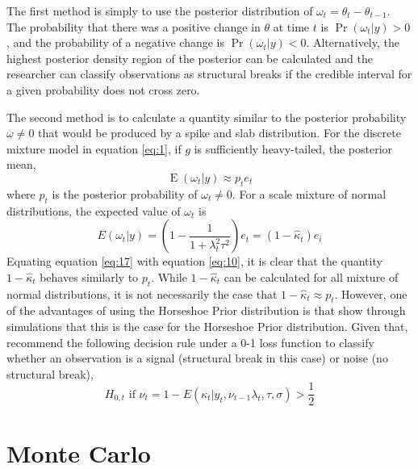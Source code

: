 \documentclass{article}
\DeclareMathOperator{\E}{E}
\begin{document}
The first method is simply to use the posterior distribution of $\omega_{t} = \theta_{t} - \theta_{t-1}$.
The probability that there was a positive change in $\theta$ at time $t$ is
$\Pr(\omega_{t} | y) > 0$, and the probability of a negative change is $\Pr(\omega_{t} | y) < 0$.
Alternatively, the highest posterior density region of the posterior can be calculated and the researcher can classify observations as structural breaks if the credible interval for a given probability does not cross zero.

The second method is to calculate a quantity similar to the posterior probability $\omega \neq 0$ that would be produced by a spike and slab distribution.
For the discrete mixture model in equation \eqref{eq:1}, if $g$ is sufficiently heavy-tailed, the posterior mean,
\begin{equation}
  \label{eq:17}
  \E(\omega_{t} | y) \approx p_{t} e_{t} 
\end{equation}
where $p_{t}$ is the posterior probability of $\omega_{t} \neq 0$.
For a scale mixture of normal distributions, the expected value of $\omega_{t}$ is 
\begin{equation}
  \label{eq:10}
  E(\omega_{t} | y) =
  \left(
    1 - \frac{1}{1 + \lambda^{2}_{t} \tau^{2}}
  \right) e_{t} = (1 - \hat \kappa_{t}) e_{i}
\end{equation}
Equating equation \eqref{eq:17} with equation \eqref{eq:10}, it is clear that 
the quantity $1 - \hat \kappa_{t}$ behaves similarly to $p_{t}$.
While $1 - \hat \kappa_{t}$ can be calculated for all mixture of normal distributions, it is not necessarily the case that $1 - \hat \kappa_{t} \approx p_{t}$.
However, one of the advantages of using the Horseshoe Prior distribution is that 
\parencite[474]{CarvalhoPolsonScott2010} show through simulations that this is the case for the Horseshoe Prior distribution.
Given that, \textcite{CarvalhoPolsonScott2010} recommend the following  decision rule under a 0-1 loss function to classify whether an observation is a signal (structural break in this case) or noise (no structural break), 
\begin{equation}
  \label{eq:5}
  \text{$H_{0,t}$ if $\nu_{t} = 1 - E(\kappa_{t}|y_{t}, \nu_{t-1} \lambda_{t}, \tau, \sigma) > \frac{1}{2}$}
\end{equation}

\section{Monte Carlo}
\label{sec:monte-carlo}
\end{document}
